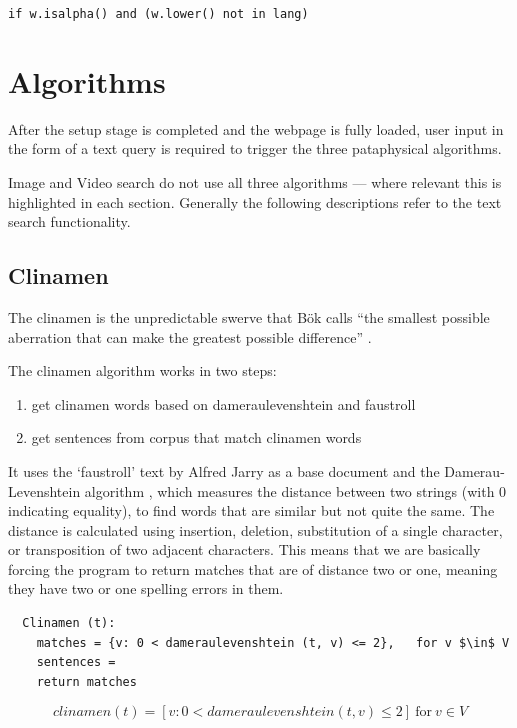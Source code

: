\texttt{if w.isalpha() and (w.lower() not in lang)}


\section{Algorithms}

After the setup stage is completed and the webpage is fully loaded, user input in the form of a text query is required to trigger the three pataphysical algorithms.

Image and Video search do not use all three algorithms --- where relevant this is highlighted in each section. Generally the following descriptions refer to the text search functionality.


\subsection{Clinamen}

The clinamen is the unpredictable swerve that Bök calls ``the smallest possible aberration that can make the greatest possible difference'' \parencite{Boek2002}.

The clinamen algorithm works in two steps:
\begin{enumerate}
  \item get clinamen words based on dameraulevenshtein and faustroll
  \item get sentences from corpus that match clinamen words
\end{enumerate}


It uses the `faustroll' text by Alfred Jarry as a base document and the Damerau-Levenshtein algorithm \parencite{Damerau1964, Levenshtein1966}, which measures the distance between two strings (with 0 indicating equality), to find words that are similar but not quite the same. The distance is calculated using insertion, deletion, substitution of a single character, or transposition of two adjacent characters. This means that we are basically forcing the program to return matches that are of distance two or one, meaning they have two or one spelling errors in them.

\begin{verbatim}
  Clinamen (t):
    matches = {v: 0 < dameraulevenshtein (t, v) <= 2},   for v $\in$ V
    sentences =
    return matches
\end{verbatim}

\begin{equation}
  clinamen(t) = [v \colon 0 < dameraulevenshtein(t,v) \leq 2] \ \text{for} \ v \in V
\label{eq:clinamen}
\end{equation}

